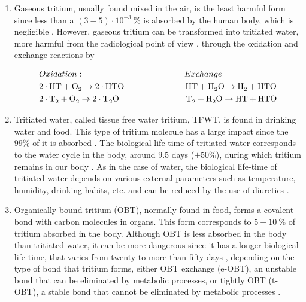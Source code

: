\begin{enumerate}
\item{} Gaseous tritium, usually found mixed in the air, is the least harmful form since less than a $(3-5) \cdot{} 10^{-3}~\%$ is absorbed by the human body, which is negligible \cite{TritiumHandling}. However, gaseous tritium can be transformed into tritiated water, more harmful from the radiological point of view \cite{TritiumHandling}, through the oxidation and exchange reactions by

\begin{equation}
\begin{split}
& Oxidation: \qquad \qquad \qquad \qquad \qquad \qquad Exchange\\
& 2\cdot{}\ce{HT} + \ce{O_2} \rightarrow 2 \cdot{} \ce{HTO} ~ \quad \qquad \qquad \qquad \ce{HT} + \ce{H_2 O} \rightarrow \ce{H_2} + \ce{HTO}\\
& 2\cdot{}\ce{T_2} + \ce{O_2} \rightarrow 2 \cdot{} \ce{T_2 O} \qquad \qquad \qquad \qquad \ce{T_2} + \ce{H_2 O} \rightarrow \ce{HT} + \ce{HTO}
\label{eq:OxidationExchange}
\end{split}
\end{equation}

\item{} Tritiated water, called tissue free water tritium, TFWT, is found in drinking water and food. This type of tritium molecule has a large impact since the $99\%$ of it is absorbed \cite{TritiumHandling}. The biological life-time of tritiated water corresponds to the water cycle in the body, around $9.5$ days ($\pm50\%$), during which tritium remains in our body \cite{TritiumHandling, FranceTritiumEnvironment, EstimationTritiumDosi, TissueDistribution}. As in the case of water, the biological life-time of tritiated water depends on various external parameters such as temperature, humidity, drinking habits, etc. and can be reduced by the use of diuretics \cite{TritiumHandling}.

\item{} Organically bound tritium (OBT), normally found in food, forms a covalent bond with carbon molecules in organs. This form corresponds to $5-10~\%$ of tritium absorbed in the body. Although OBT is less absorbed in the body than tritiated water, it can be more dangerous since it has a longer biological life time, that varies from twenty to more than fifty days \cite{EstimationTritiumDosiKangarooRats, TissueDistribution}, depending on the type of bond that tritium forms, either OBT exchange (e-OBT), an unstable bond that can be eliminated by metabolic processes, or tightly OBT (t-OBT), a stable bond that cannot be eliminated by metabolic processes \cite{FranceTritiumEnvironment, EstimationTritiumDosi, EstimationTritiumDosiRats, EstimationTritiumDosiKangarooRats}.
\end{enumerate}

